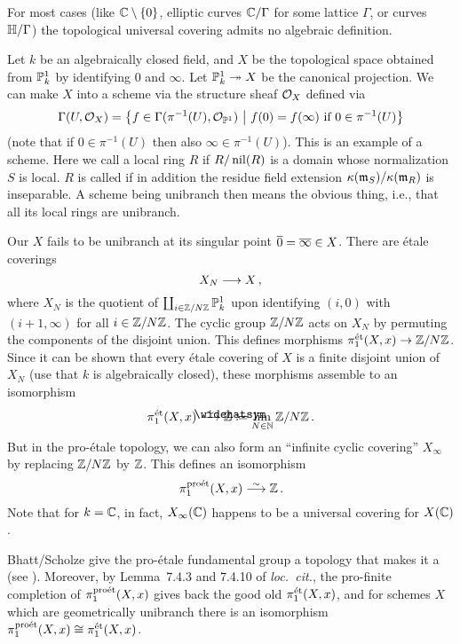 \documentclass[a4paper, 10pt, oneside, DIV=9, chapterprefix=true, numbers=enddot, bibliography=totoc]{scrbook}
\begin{document}
\begin{exm}
	For most cases (like $\mathbb{C}\setminus\{0\}$, elliptic curves $\mathbb{C}/\Gamma$ for some lattice $\Gamma$, or curves $\mathbb{H}/\Gamma$) the topological universal covering admits no algebraic definition.
	
	Let $k$ be an algebraically closed field, and $X$ be the topological space obtained from $\mathbb{P}_k^1$ by identifying $0$ and $\infty$. Let $\IP_k^1\epimorphism X$ be the canonical projection. We can make $X$ into a scheme via the structure sheaf $\mathcal{O}_X$ defined via
	\begin{equation*}
		\operatorname{\Gamma}(U,\mathcal{O}_X)=\left\{f\in\operatorname{\Gamma}(\pi^{-1}(U),\mathcal{O}_{\mathbb{P}^1})\ \middle|\  f(0)=f(\infty)\text{ if }0\in\pi^{-1}(U)\right\}
	\end{equation*}
	(note that if $0\in\pi^{-1}(U)$ then also $\infty\in\pi^{-1}(U)$). This is an example of a  scheme. Here we call a local ring $R$  if $R/\operatorname{nil}(R)$ is a domain whose normalization $S$ is local. $R$ is called  if in addition the residue field extension $\kappa(\mathfrak{m}_S)/\kappa(\mathfrak{m}_R)$ is inseparable. A scheme being unibranch then means the obvious thing, i.e., that all its local rings are unibranch.
	
	Our $X$ fails to be unibranch at its singular point $\ov{0}=\ov{\infty}\in X$. There are étale coverings
	\begin{equation*}
		X_N\morphism X\,,
	\end{equation*}
	where $X_N$ is the quotient of $\coprod_{i\in\mathbb{Z}/N\mathbb{Z}}\mathbb{P}_k^1$ upon identifying $(i,0)$ with $(i+1,\infty)$ for all $i\in\mathbb{Z}/N\mathbb{Z}$. The cyclic group $\mathbb{Z}/N\mathbb{Z}$ acts on $X_N$ by permuting the components of the disjoint union. This defines morphisms $\pi_1^\et(X,x)\morphism\IZ/N\IZ$. Since it can be shown that every étale covering of $X$ is a finite disjoint union of $X_N$ (use that $k$ is algebraically closed), these morphisms assemble to an isomorphism
	\begin{equation*}
		\pi_1^\et(X,x)\isomorphism\roof{\IZ}\coloneqq\limit_{N\in\IN}\IZ/N\IZ\,.
	\end{equation*}
	But in the pro-étale topology, we can also form an \enquote{infinite cyclic covering} $X_\infty$ by replacing $\mathbb{Z}/N\mathbb{Z}$ by $\mathbb{Z}$. This defines an isomorphism
	\begin{equation*}
		\pi_1^\proet(X,x)\isomorphism \IZ\,.
	\end{equation*}
	Note that for $k=\mathbb{C}$, in fact, $X_\infty(\mathbb{C})$ happens to be a universal covering for $X(\mathbb{C})$.
	
	Bhatt/Scholze give the pro-étale fundamental group a topology that makes it a  (see \cite[Definition~7.1.1]{proetale}). Moreover, by Lemma~7.4.3 and 7.4.10 of \emph{loc.\ cit.}, the pro-finite completion of $\pi_1^{\mathrm{pro\acute{e}t}}(X,x)$ gives back the good old $\pi_1^{\mathrm{\acute{e}t}}(X,x)$, and for schemes $X$ which are geometrically unibranch there is an isomorphism $\pi_1^{\mathrm{pro\acute{e}t}}(X,x)\cong \pi_1^{\mathrm{\acute{e}t}}(X,x)$.
\end{exm}
\end{document}
